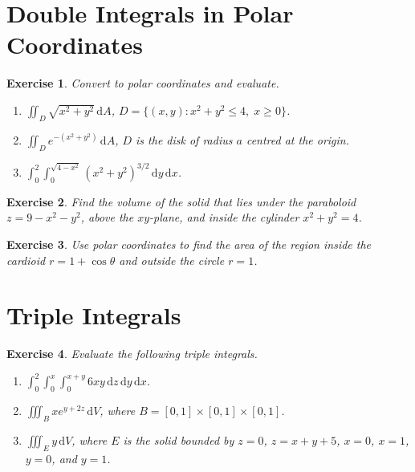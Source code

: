 \documentclass[12pt,a4paper]{article}
\theoremstyle{exercise}
\newtheorem{exercise}{Exercise}[section]
\theoremstyle{hint}
\newcommand{\dd}{\,\mathrm{d}}
\begin{document}
\section{Double Integrals in Polar Coordinates}

\begin{exercise}
Convert to polar coordinates and evaluate.
\begin{enumerate}[label=(\alph*)]
  \item $\displaystyle\iint_{D}\sqrt{x^{2}+y^{2}}\dd A$,\quad
        $D=\{(x,y):x^{2}+y^{2}\leq 4,\; x\geq 0\}$.
  \item $\displaystyle\iint_{D}e^{-(x^{2}+y^{2})}\dd A$,\quad
        $D$ is the disk of radius $a$ centred at the origin.
  \item $\displaystyle\int_{0}^{2}\int_{0}^{\sqrt{4-x^{2}}}
          (x^{2}+y^{2})^{3/2}\dd y\dd x$.
\end{enumerate}
\end{exercise}

\begin{exercise}
Find the volume of the solid that lies under the paraboloid
$z=9-x^{2}-y^{2}$, above the $xy$-plane, and inside the cylinder
$x^{2}+y^{2}=4$.
\end{exercise}

\begin{exercise}
Use polar coordinates to find the area of the region inside the
cardioid $r=1+\cos\theta$ and outside the circle $r=1$.
\end{exercise}

\section{Triple Integrals}

\begin{exercise}
Evaluate the following triple integrals.
\begin{enumerate}[label=(\alph*)]
  \item $\displaystyle\int_{0}^{2}\int_{0}^{x}\int_{0}^{x+y}
          6xy\dd z\dd y\dd x$.
  \item $\displaystyle\iiint_{B}xe^{y+2z}\dd V$, where
        $B=[0,1]\times[0,1]\times[0,1]$.
  \item $\displaystyle\iiint_{E}y\dd V$, where $E$ is the solid bounded
        by $z=0$, $z=x+y+5$, $x=0$, $x=1$, $y=0$, and $y=1$.
\end{enumerate}
\end{exercise}
\end{document}
